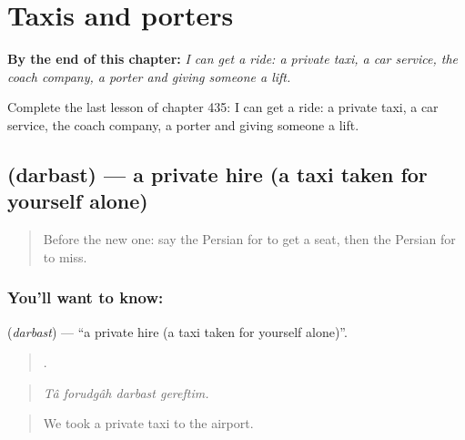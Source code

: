 
\chapter{Taxis and porters}
\label{ch:fa-taxis-and-porters}

\begin{chapteropening}
\textbf{By the end of this chapter:} \emph{I can get a ride: a private taxi, a car service, the coach company, a porter and giving someone a lift.}

Complete the last lesson of chapter 435: I can get a ride: a private taxi, a car service, the coach company, a porter and giving someone a lift.
\end{chapteropening}

\section[\texorpdfstring{\fa{دربست} (darbast)}{دربست (darbast)}]{ (darbast) — a private hire (a taxi taken for yourself alone)}

\label{lesson:FA-C435-darbast}



\begin{quote}
Before the new one: say the Persian for to get a seat, then the Persian for to miss.
\end{quote}

\subsection*{You'll want to know: }
\textbf{} (\emph{darbast}) — \textquotedblleft{}a private hire (a taxi taken for yourself alone)\textquotedblright{}.

\begin{quote}
   .
\end{quote}

\begin{quote}
\emph{Tâ forudgâh darbast gereftim.}
\end{quote}

\begin{quote}
We took a private taxi to the airport.
\end{quote}

